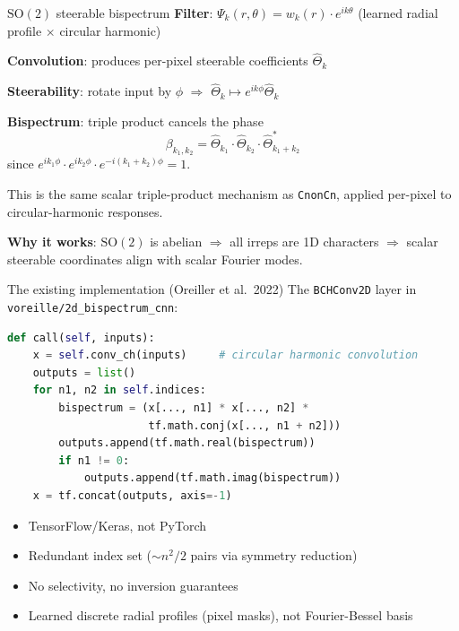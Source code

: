 \documentclass[aspectratio=169]{beamer}
\newcommand{\SO}{\mathrm{SO}}
\begin{document}
\begin{frame}{$\SO(2)$ steerable bispectrum}
  \textbf{Filter}: $\Psi_k(r, \theta) = w_k(r) \cdot e^{ik\theta}$ \quad (learned radial profile $\times$ circular harmonic)

  \medskip

  \textbf{Convolution}: produces per-pixel steerable coefficients $\hat{\Theta}_k$

  \medskip

  \textbf{Steerability}: rotate input by $\phi$ $\Rightarrow$ $\hat{\Theta}_k \mapsto e^{ik\phi} \hat{\Theta}_k$

  \medskip

  \textbf{Bispectrum}: triple product cancels the phase
  \[
    \beta_{k_1, k_2} = \hat{\Theta}_{k_1} \cdot \hat{\Theta}_{k_2} \cdot \hat{\Theta}^*_{k_1+k_2}
  \]
  since $e^{ik_1\phi} \cdot e^{ik_2\phi} \cdot e^{-i(k_1+k_2)\phi} = 1$.

  \bigskip

  This is the same scalar triple-product mechanism as \texttt{CnonCn}, applied per-pixel to circular-harmonic responses.

  \medskip

  \textbf{Why it works}: $\SO(2)$ is abelian $\Rightarrow$ all irreps are 1D characters $\Rightarrow$ scalar steerable coordinates align with scalar Fourier modes.
\end{frame}

\begin{frame}[fragile]{The existing implementation (Oreiller et al.\ 2022)}
  The \texttt{BCHConv2D} layer in \texttt{voreille/2d\_bispectrum\_cnn}:

  \begin{lstlisting}[language=Python]
def call(self, inputs):
    x = self.conv_ch(inputs)     # circular harmonic convolution
    outputs = list()
    for n1, n2 in self.indices:
        bispectrum = (x[..., n1] * x[..., n2] *
                      tf.math.conj(x[..., n1 + n2]))
        outputs.append(tf.math.real(bispectrum))
        if n1 != 0:
            outputs.append(tf.math.imag(bispectrum))
    x = tf.concat(outputs, axis=-1)
  \end{lstlisting}

  \medskip

  \begin{itemize}
    \item TensorFlow/Keras, not PyTorch
    \item Redundant index set (${\sim}n^2/2$ pairs via symmetry reduction)
    \item No selectivity, no inversion guarantees
    \item Learned discrete radial profiles (pixel masks), not Fourier-Bessel basis
  \end{itemize}
\end{frame}
\end{document}
